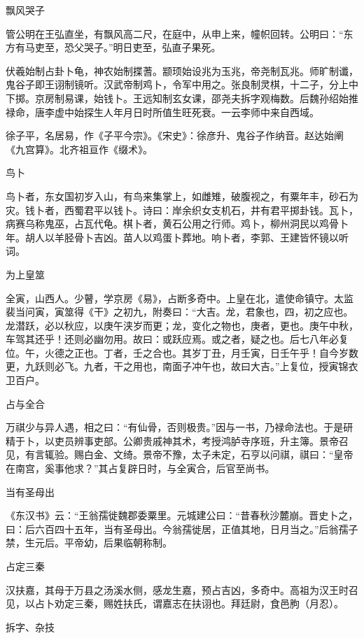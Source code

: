 \documentclass[a4paper,12pt,UTF8,twoside]{ctexbook}
\begin{document}
    飘风哭子
    
    管公明在王弘直坐，有飘风高二尺，在庭中，从申上来，幢帜回转。公明曰：“东方有马吏至，恐父哭子。”明日吏至，弘直子果死。
    
    伏羲始制占卦卜龟，神农始制揲蓍。颛顼始设兆为玉兆，帝尧制瓦兆。师旷制谶，鬼谷子即王诩制镜听。汉武帝制鸡卜，令军中用之。张良制灵棋，十二子，分上中下掷。京房制易课，始钱卜。王远知制玄女课，邵尧夫拆字观梅数。后魏孙绍始推禄命，唐李虚中始探生人年月日时所值生旺死衰。一云李师中来自西域。
    
    徐子平，名居易，作《子平今宗》。《宋史》：徐彦升、鬼谷子作纳音。赵达始阐《九宫算》。北齐祖亘作《缀术》。
    
    鸟卜
    
    鸟卜者，东女国初岁入山，有鸟来集掌上，如雌雉，破腹视之，有粟年丰，砂石为灾。钱卜者，西蜀君平以钱卜。诗曰：岸余织女支机石，井有君平掷卦钱。瓦卜，病赛乌称鬼巫，占瓦代龟。棋卜者，黄石公用之行师。鸡卜，柳州洞民以鸡骨卜年。胡人以羊胫骨卜吉凶。苗人以鸡蛋卜葬地。响卜者，李郭、王建皆怀镜以听词。
    
    为上皇筮
    
    全寅，山西人。少瞽，学京房《易》，占断多奇中。上皇在北，遣使命镇守。太监裴当问寅，寅筮得《干》之初九，附奏曰：“大吉。龙，君象也，四，初之应也。龙潜跃，必以秋应，以庚午浃岁而更；龙，变化之物也，庚者，更也。庚午中秋，车驾其还乎！还则必幽勿用。故曰：或跃应焉。或之者，疑之也。后七八年必复位。午，火德之正也。丁者，壬之合也。其岁丁丑，月壬寅，日壬午乎！自今岁数更，九跃则必飞。九者，干之用也，南面子冲午也，故曰大吉。”上复位，授寅锦衣卫百户。
    
    占与全合
    
    万祺少与异人遇，相之曰：“有仙骨，否则极贵。”因与一书，乃禄命法也。于是研精于卜，以吏员辨事吏部。公卿贵戚神其术，考授鸿胪寺序班，升主簿。景帝召见，有言辄验。赐白金、文绮。景帝不豫，太子未定，石亨以问祺，祺曰：“皇帝在南宫，奚事他求？”其占复辟日时，与全寅合，后官至尚书。
    
    当有圣母出
    
    《东汉书》云：“王翁孺徙魏郡委粟里。元城建公曰：“昔春秋沙麓崩。晋史卜之，曰：后六百四十五年，当有圣母出。今翁孺徙居，正值其地，日月当之。”后翁孺子禁，生元后。平帝幼，后果临朝称制。
    
    占定三秦
    
    汉扶嘉，其母于万县之汤溪水侧，感龙生嘉，预占吉凶，多奇中。高祖为汉王时召见，以占卜劝定三秦，赐姓扶氏，谓嘉志在扶诩也。拜廷尉，食邑朐（月忍）。
    
    拆字、杂技
    
\end{document}
